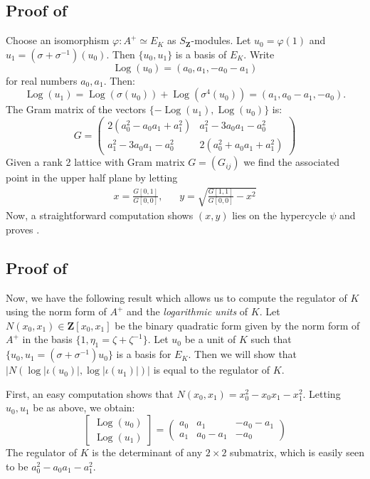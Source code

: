 \documentclass{amsart}
\newcommand{\ZZ}{\mathbf{Z}}
\DeclareMathOperator{\Log}{Log}
\numberwithin{equation}{section}
\begin{document}
\subsection{Proof of }
Choose an isomorphism $\varphi \colon A^+ \simeq E_K$ as $S_{\ZZ}$-modules. Let $u_0 = \varphi(1)$ and $u_1 = (\sigma + \sigma^{-1})(u_0)$. Then $\{u_0,u_1\}$ is a basis of $E_K$. 
Write 
\[
    \Log(u_0) = (a_0, a_1, -a_0-a_1)
\]
for real numbers $a_0,a_1$. Then:
\[
    \Log(u_1) = \Log(\sigma(u_0)) + \Log(\sigma^4(u_0)) = (a_1, a_0 - a_1, -a_0).
\]
\noindent The Gram matrix of the vectors $\{-\Log(u_1),\Log(u_0)\}$ is:
 	\[	G =
			\begin{pmatrix}
				2(a_0^2 - a_0a_1 + a_1^2)	&	a_1^2 - 3a_0a_1 - a_0^2						\\
				a_1^2 - 3a_0a_1 - a_0^2		&	2(a_0^2 + a_0a_1 + a_1^2 )
			\end{pmatrix}
 	\]
 Given a rank 2 lattice with Gram matrix $G = (G_{ij})$ we find the associated point in the upper half plane by letting
 	\begin{align*}
		x 	= \frac{G[0,1]}{G[0,0]},	&\;\;\;		y	= \sqrt{\frac{G[1,1]}{G[0,0]} - x^2}
	\end{align*}
Now, a straightforward computation shows $(x,y)$ lies on the hypercycle $\psi$ and proves .
 
 \subsection{Proof of }
 Now, we have the following result which allows us to compute the regulator of $K$ using the norm form of $A^+$ and the \emph{logarithmic units} of $K$. Let $N(x_0, x_1)\in \ZZ[x_0, x_1]$ be the binary quadratic form given by the norm form of $A^+$ in the basis $\{1, \eta_1= \zeta + \zeta^{-1}\}$. Let $u_0$ be a unit of $K$ such that $\{u_0, u_1 = (\sigma + \sigma^{-1})u_0\}$ is a basis for $E_K$. Then we will show that $\lvert N(\log \lvert \iota(u_0) \rvert, \log \lvert \iota(u_1) \rvert) \rvert$ is equal to the regulator of $K$.
 
First, an easy computation shows that $N(x_0, x_1) = x_0^2  - x_0x_1 - x_1^2$. Letting $u_0, u_1$ be as above, we obtain:
\[
    \begin{bmatrix}
           \Log(u_0) \\           
           \Log(u_1)
    \end{bmatrix} = 
    \begin{pmatrix}
		a_0	&	a_1	& -a_0 - a_1	\\
		a_1 	&	a_0 - a_1	& -a_0
	\end{pmatrix}
\]
The regulator of $K$ is the determinant of any $2\times 2$ submatrix, which is easily seen to be $a_0^2  - a_0a_1 - a_1^2$.
\end{document}
